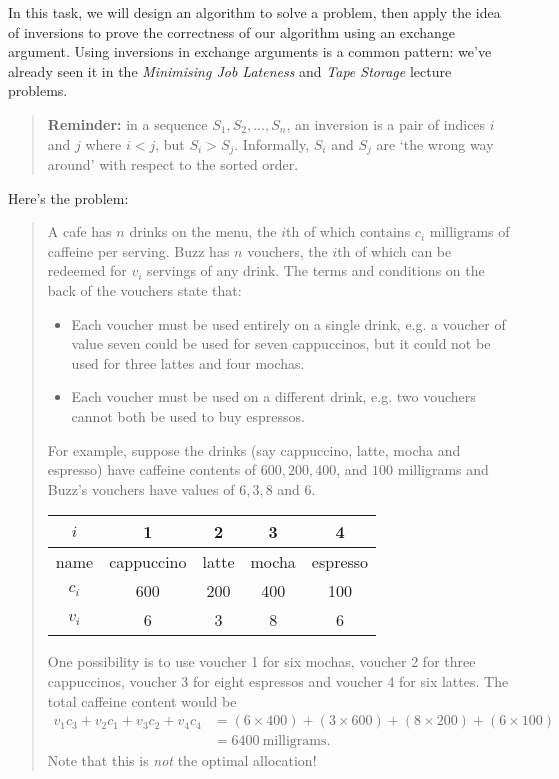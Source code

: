 \documentclass[12pt]{article}
\begin{document}
\begin{question}
In this task, we will design an algorithm to solve a problem, then apply the idea of inversions to prove the correctness of our algorithm using an exchange argument. Using inversions in exchange arguments is a common pattern: we've already seen it in the \textit{Minimising Job Lateness} and \textit{Tape Storage} lecture problems.

\begin{quote}
    \textbf{Reminder:} in a sequence $S_1, S_2, \dots, S_n$, an inversion is a pair of indices $i$ and $j$ where $i < j$, but $S_i > S_j$. Informally, $S_i$ and $S_j$ are `the wrong way around' with respect to the sorted order.
\end{quote}

Here's the problem:
\begin{quote}
    A cafe has $n$ drinks on the menu, the $i$th of which contains $c_i$ milligrams of caffeine per serving. Buzz has $n$ vouchers, the $i$th of which can be redeemed for $v_i$ servings of any drink. The terms and conditions on the back of the vouchers state that:
    \begin{itemize}
        \item Each voucher must be used entirely on a single drink, e.g. a voucher of value seven could be used for seven cappuccinos, but it could not be used for three lattes and four mochas.
        \item Each voucher must be used on a different drink, e.g. two vouchers cannot both be used to buy espressos.
    \end{itemize}

    For example, suppose the drinks (say cappuccino, latte, mocha and espresso) have caffeine contents of $600, 200, 400$, and $100$ milligrams and Buzz's vouchers have values of $6, 3, 8$ and $6$.
    \begin{center}
    \begin{tabular}{|c|c|c|c|c|}
        \hline 
        \(i\) & 1 & 2 & 3 & 4  \\ \hline 
        name & cappuccino & latte & mocha & espresso \\ \hline
        \(c_i\) & 600 & 200 & 400 & 100 \\ \hline
        \(v_i\) & 6 & 3 & 8 & 6 \\ \hline
    \end{tabular}
\end{center}
    One possibility is to use voucher 1 for six mochas, voucher 2 for three cappuccinos, voucher 3 for eight espressos and voucher 4 for six lattes. The total caffeine content would be 
    \begin{align*}
     v_1c_3 + v_2c_1 + v_3c_2 + v_4c_4 &= (6\times400)+(3\times600)+(8\times200)+(6\times100) \\
     &= 6400\ \text{milligrams}.
    \end{align*}
     Note that this is \textit{not} the optimal allocation!


\end{quote}
\end{question}
\end{document}
